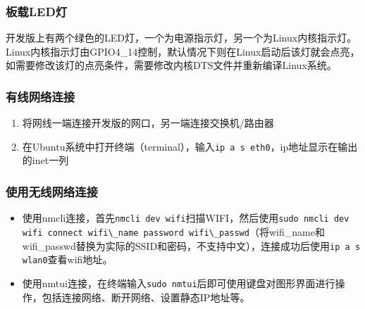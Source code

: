 \subsubsection{板载LED灯}\label{ux677fux8f7dledux706f}

开发版上有两个绿色的LED灯，一个为电源指示灯，另一个为Linux内核指示灯。
Linux内核指示灯由GPIO4\_14控制，默认情况下则在Linux启动后该灯就会点亮，如需要修改该灯的点亮条件，需要修改内核DTS文件并重新编译Linux系统。

\subsubsection{有线网络连接}\label{ux6709ux7ebfux7f51ux7edcux8fdeux63a5}

\begin{enumerate}
\def\labelenumi{\arabic{enumi}.}
\tightlist
\item
  将网线一端连接开发版的网口，另一端连接交换机/路由器
\item
  在Ubuntu系统中打开终端（terminal），输入\passthrough{\lstinline!ip a s eth0!}，ip地址显示在输出的inet一列
\end{enumerate}

\subsubsection{使用无线网络连接}\label{ux4f7fux7528ux65e0ux7ebfux7f51ux7edcux8fdeux63a5}

\begin{itemize}
\tightlist
\item
  使用nmcli连接，首先\passthrough{\lstinline!nmcli dev wifi!}扫描WIFI，然后使用\passthrough{\lstinline!sudo nmcli dev wifi connect wifi\_name password wifi\_passwd!}（将wifi\_name和wifi\_passwd替换为实际的SSID和密码，不支持中文），连接成功后使用\passthrough{\lstinline!ip a s wlan0!}查看wifi地址。
\item
  使用nmtui连接，在终端输入\passthrough{\lstinline!sudo nmtui!}后即可使用键盘对图形界面进行操作，包括连接网络、断开网络、设置静态IP地址等。
\end{itemize}

